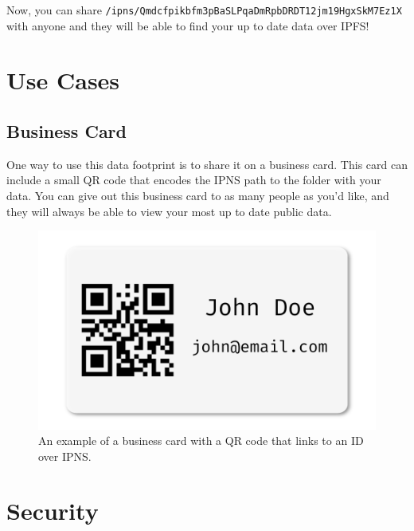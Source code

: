 \documentclass{article}
\begin{document}
Now, you can share \texttt{/ipns/Qmdcfpikbfm3pBaSLPqaDmRpbDRDT12jm19HgxSkM7Ez1X} with anyone and they will be able to find your up to date data over IPFS!

\section{Use Cases}

\subsection{Business Card}

One way to use this data footprint is to share it on a business card. This card can include a small QR code that encodes the IPNS path to the folder with your data. You can give out this business card to as many people as you'd like, and they will always be able to view your most up to date public data. 

\begin{figure}[h]
  \centering
  \includegraphics{resources/business_card.png}
  \caption{An example of a business card with a QR code that links to an ID over IPNS.}
\end{figure}

\section{Security}
 
\end{document}
